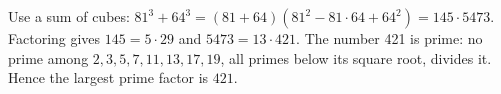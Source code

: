 Use a sum of cubes: $81^3+64^3=(81+64)(81^2-81\cdot64+64^2)=145\cdot5473$. Factoring gives $145=5\cdot29$ and $5473=13\cdot421$. The number 421 is prime: no prime among $2,3,5,7,11,13,17,19$, all primes below its square root, divides it. Hence the largest prime factor is $\boxed{421}$.
